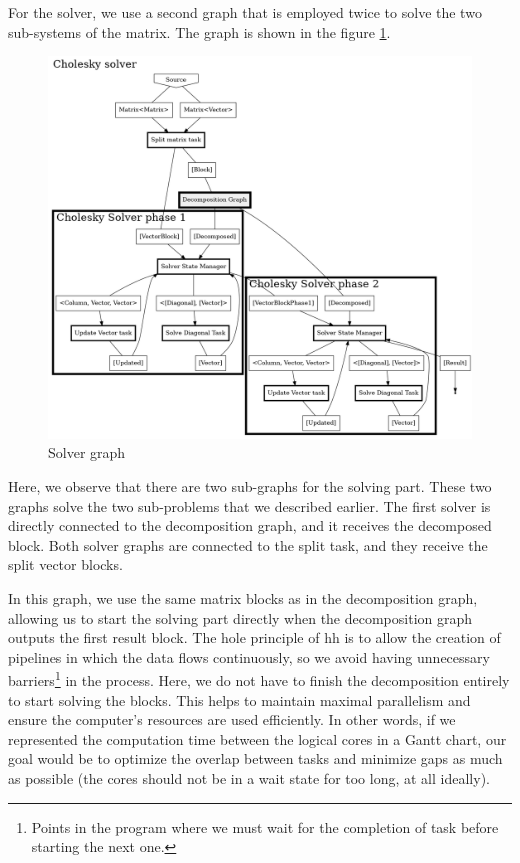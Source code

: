 For the solver, we use a second graph that is employed twice to solve the two
sub-systems of the matrix. The graph is shown in the figure
\ref{fig:solvergraph}.

\begin{figure}[!ht]
  \begin{center}
    \includegraphics[scale=0.2]{img/cho-img/solver_graph.png}
    \caption{Solver graph}
    \label{fig:solvergraph}
  \end{center}
\end{figure}

Here, we observe that there are two sub-graphs for the solving part. These two
graphs solve the two sub-problems that we described earlier. The first solver is
directly connected to the decomposition graph, and it receives the decomposed
block. Both solver graphs are connected to the split task, and they receive the
split vector blocks.

In this graph, we use the same matrix blocks as in the decomposition graph,
allowing us to start the solving part directly when the decomposition graph
outputs the first result block. The hole principle of \gls{hh} is to allow the
creation of pipelines in which the data flows continuously, so we avoid having
unnecessary barriers\footnote{Points in the program where we must wait for the
completion of task before starting the next one.} in the process. Here, we do
not have to finish the decomposition entirely to start solving the blocks. This
helps to maintain maximal parallelism and ensure the computer's resources are
used efficiently. In other words, if we represented the computation time between
the logical cores in a Gantt chart, our goal would be to optimize the overlap
between tasks and minimize gaps as much as possible (the cores should not be in
a wait state for too long, at all ideally).

